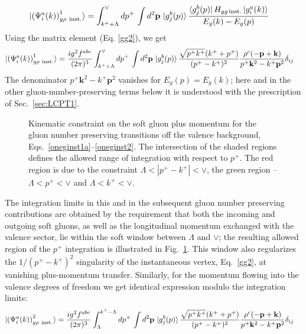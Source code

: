 \documentclass[a4paper,11pt]{article}
\def\v#1{\mathbf{#1}}
\begin{document}
\begin{figure}[htbp]
\centering
\end{figure}
\begin{align}\label{oneginst1a}
  \ket{ \left(\Psi^{a}_{i}(k) \right)^{1}_{g \rho\ {\rm inst.} } }
   & =\int_{k^{+}+\Lambda}^{\vee} 
   d p^+\, \int d^2\v{p}\,
   \ket{g_{j}^{b}(p)} 
   \frac{ \bra{g_{j}^{b}(p)}H_{gg\,\text{inst.}}\ket{g_{i}^{a}(k)}}{E_{g}(k)-E_{g}(p)}
\end{align}
Using the matrix element (Eq. \eqref{gg2}), we get
\begin{align}
 \ket{ \left(\Psi^{a}_{i}(k) \right)^{1}_{g \rho\ {\rm inst.} } }   & =  \frac{ig^2 f^{abc}}{(2\pi)^3} 
   \int_{k^+ + \Lambda}^{\vee}
   d p^+\, \int d^2\v{p}\, \ket{g_{j}^{b}(p)}
   \frac{\sqrt{p^{+}k^{+}} (k^++p^+) } {(p^+-k^+)^2} \frac{\rho^c(-\v{p}+\v{k})}{p^{+}\v{k}^2 - k^{+}\v{p}^2} \delta_{ij}
\end{align}
{\color{chg}The denominator $p^{+}\v{k}^{2}-k^{+}\v{p}^{2}$ vanishes for $E_{g}(p)=E_{g}(k)$; here and in the other gluon-number-preserving terms below it is understood with the prescription of Sec.~\ref{sec:LCPT1}.}

\begin{figure}[htbp]
\centering
{}
\caption{Kinematic constraint on the soft gluon plus momentum for the gluon number preserving transitions off the valence background, Eqs.~\eqref{oneginst1a}--\eqref{oneginst2}. The intersection of the shaded regions defines the allowed range of integration with respect to $p^+$.
  The red region is due to the constraint {\color{chg}$\Lambda<|p^{+}-k^{+}|<\vee$}, the green region --  $ \Lambda < p^+  < \vee $
and  $ \Lambda <  k^+ < \vee$.
}
\label{fig:kinem}
\end{figure}
The integration limits in this and in the subsequent gluon number preserving contributions are obtained by the requirement that both the incoming and outgoing soft gluons, as well as the longitudinal momentum exchanged with the valence sector, lie within the soft window between $\Lambda$ and $\vee$; the resulting allowed region of the $p^{+}$ integration is illustrated in Fig.~\ref{fig:kinem}. {\color{chg}This window also regularizes the $1/(p^{+}-k^{+})^{2}$ singularity of the instantaneous vertex, Eq.~\eqref{gg2}, at vanishing plus-momentum transfer.} Similarly, for the  momentum flowing into the valence degrees of freedom we get identical expression modulo the integration limits:
\begin{align}\label{oneginst2}
  \ket{\left(\Psi^{a}_{i}(k) \right)^{2}_{g \rho\ {\rm inst.} } }
   & =  \frac{ig^2 f^{abc}}{(2\pi)^3}
   \int_{\Lambda}^{k^{+}-\Lambda}
   d p^+\, \int d^2\v{p}\, \ket{g_{j}^{b}(p)}
   \frac{\sqrt{p^{+}k^{+}} (k^++p^+) } {(p^+-k^+)^2} \frac{\rho^c(-\v{p}+\v{k})}{p^{+}\v{k}^2 - k^{+}\v{p}^2} \delta_{ij}
\end{align}
\end{document}
